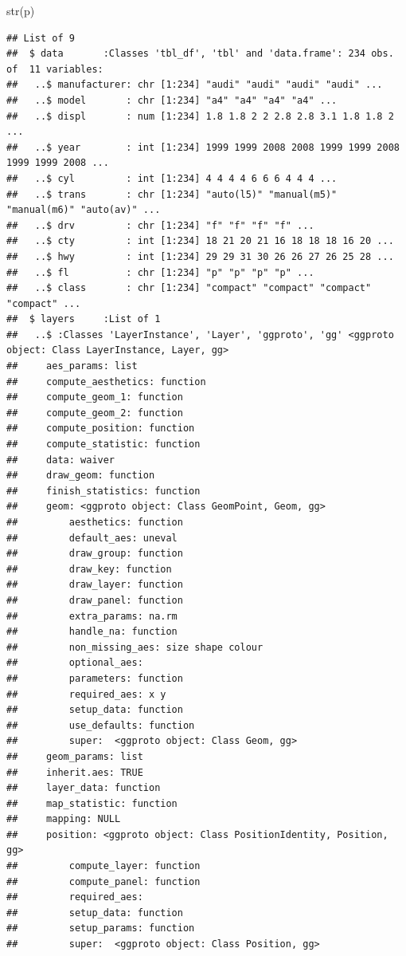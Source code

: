 \documentclass[]{book}
\newenvironment{Shaded}{}{}
\newcommand{\KeywordTok}[1]{\textcolor[rgb]{0.00,0.00,1.00}{#1}}
\newcommand{\NormalTok}[1]{#1}
\begin{document}
\begin{Shaded}
\begin{Highlighting}[]
\KeywordTok{str}\NormalTok{(p)}
\end{Highlighting}
\end{Shaded}

\begin{verbatim}
## List of 9
##  $ data       :Classes 'tbl_df', 'tbl' and 'data.frame': 234 obs. of  11 variables:
##   ..$ manufacturer: chr [1:234] "audi" "audi" "audi" "audi" ...
##   ..$ model       : chr [1:234] "a4" "a4" "a4" "a4" ...
##   ..$ displ       : num [1:234] 1.8 1.8 2 2 2.8 2.8 3.1 1.8 1.8 2 ...
##   ..$ year        : int [1:234] 1999 1999 2008 2008 1999 1999 2008 1999 1999 2008 ...
##   ..$ cyl         : int [1:234] 4 4 4 4 6 6 6 4 4 4 ...
##   ..$ trans       : chr [1:234] "auto(l5)" "manual(m5)" "manual(m6)" "auto(av)" ...
##   ..$ drv         : chr [1:234] "f" "f" "f" "f" ...
##   ..$ cty         : int [1:234] 18 21 20 21 16 18 18 18 16 20 ...
##   ..$ hwy         : int [1:234] 29 29 31 30 26 26 27 26 25 28 ...
##   ..$ fl          : chr [1:234] "p" "p" "p" "p" ...
##   ..$ class       : chr [1:234] "compact" "compact" "compact" "compact" ...
##  $ layers     :List of 1
##   ..$ :Classes 'LayerInstance', 'Layer', 'ggproto', 'gg' <ggproto object: Class LayerInstance, Layer, gg>
##     aes_params: list
##     compute_aesthetics: function
##     compute_geom_1: function
##     compute_geom_2: function
##     compute_position: function
##     compute_statistic: function
##     data: waiver
##     draw_geom: function
##     finish_statistics: function
##     geom: <ggproto object: Class GeomPoint, Geom, gg>
##         aesthetics: function
##         default_aes: uneval
##         draw_group: function
##         draw_key: function
##         draw_layer: function
##         draw_panel: function
##         extra_params: na.rm
##         handle_na: function
##         non_missing_aes: size shape colour
##         optional_aes: 
##         parameters: function
##         required_aes: x y
##         setup_data: function
##         use_defaults: function
##         super:  <ggproto object: Class Geom, gg>
##     geom_params: list
##     inherit.aes: TRUE
##     layer_data: function
##     map_statistic: function
##     mapping: NULL
##     position: <ggproto object: Class PositionIdentity, Position, gg>
##         compute_layer: function
##         compute_panel: function
##         required_aes: 
##         setup_data: function
##         setup_params: function
##         super:  <ggproto object: Class Position, gg>

\end{verbatim}
\end{document}
